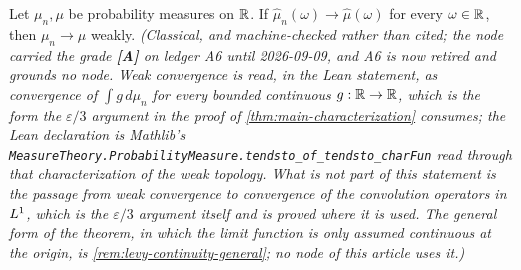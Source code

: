 \begin{proposition}\label{prop:levy-continuity}
\leanok
Let $\mu_n, \mu$ be probability measures on $\mathbb{R}$. If $\hat\mu_n(\omega) \to \hat\mu(\omega)$
for every $\omega \in \mathbb{R}$, then $\mu_n \to \mu$ weakly.
\statusT\quad\emph{(Classical, and machine-checked rather than cited; the node carried the grade
\textbf{[A]} on ledger A6 until 2026-09-09, and A6 is now retired and grounds no node. Weak
convergence is read, in the Lean statement, as convergence of $\int g\,d\mu_n$ for every bounded
continuous $g : \mathbb{R} \to \mathbb{R}$, which is the form the $\varepsilon/3$ argument in the proof of
\ref{thm:main-characterization} consumes; the Lean declaration is Mathlib's
\texttt{MeasureTheory.ProbabilityMeasure.tendsto\_of\_tendsto\_charFun} read through that
characterization of the weak topology. What is \emph{not} part of this statement is the passage
from weak convergence to convergence of the convolution operators in $L^1$, which is the
$\varepsilon/3$ argument itself and is proved where it is used. The general form of the theorem,
in which the limit function is only assumed continuous at the origin, is
\ref{rem:levy-continuity-general}; no node of this article uses it.)}
\end{proposition}

